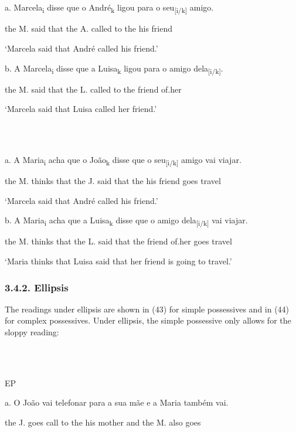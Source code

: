 \documentclass[output=paper]{langsci/langscibook}
\begin{document}
\ea%
    \label{ex:key:41}
    \gll\\
        \\
    \glt
    \z

          a.  Marcela\textsubscript{i} disse que o André\textsubscript{k} ligou para o seu\textsubscript{[i/k]} amigo.

the M. said that the A. called to the his friend

‘Marcela said that André called his friend.’

  b.  A Marcela\textsubscript{i} disse que a Luisa\textsubscript{k} ligou para o amigo dela\textsubscript{[i/k]}.

the M. said that the L. called to the friend of.her

‘Marcela said that Luisa called her friend.’

\ea%
    \label{ex:key:42}
    \gll\\
        \\
    \glt
    \z

          a.  A Maria\textsubscript{i} acha que o João\textsubscript{k} disse que o seu\textsubscript{[i/k]} amigo vai viajar.

the M. thinks that the J. said that the his friend goes travel

‘Marcela said that André called his friend.’

  b.  A Maria\textsubscript{i} acha que a Luisa\textsubscript{k} disse que o amigo dela\textsubscript{[i/k]} vai viajar.

the M. thinks that the L. said that the friend of.her goes travel

‘Maria thinks that Luisa said that her friend is going to travel.’

\subsubsection{ 3.4.2. Ellipsis}

The readings under ellipsis are shown in (43) for simple possessives and in (44) for complex possessives. Under ellipsis, the simple possessive only allows for the sloppy reading:

\ea%
    \label{ex:key:43}
    \gll\\
        \\
    \glt
    \z

          EP

  a.  O João vai telefonar para a sua mãe e a Maria também vai.

the J.   goes call to the his mother and the M. also goes
\end{document}
